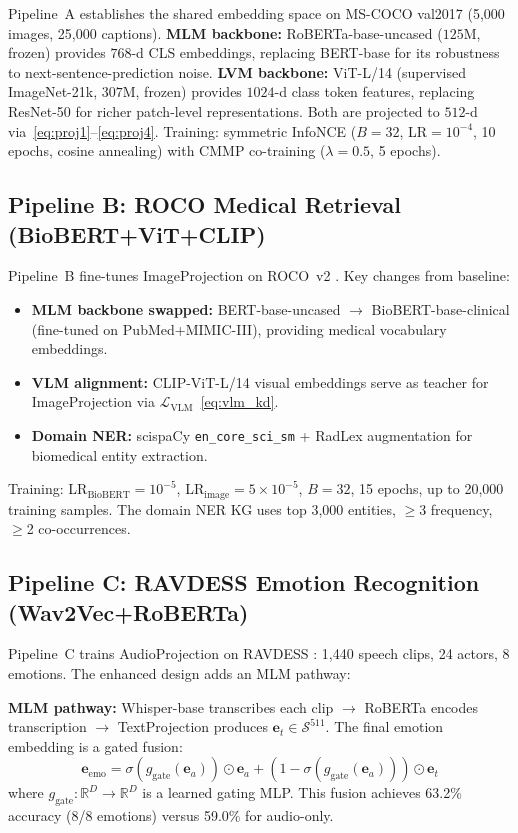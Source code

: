 \documentclass[10pt,conference]{IEEEtran}
\theoremstyle{ieeethm}
\theoremstyle{ieeedef}
\theoremstyle{ieeeremark}
\begin{document}
Pipeline~A establishes the shared embedding space on MS-COCO val2017 (5,000 images, 25,000 captions). \textbf{MLM backbone:} RoBERTa-base-uncased ($125$M, frozen) provides $768$-d CLS embeddings, replacing BERT-base for its robustness to next-sentence-prediction noise. \textbf{LVM backbone:} ViT-L/14 (supervised ImageNet-21k, $307$M, frozen) provides $1024$-d class token features, replacing ResNet-50 for richer patch-level representations. Both are projected to $512$-d via~\eqref{eq:proj1}--\eqref{eq:proj4}. Training: symmetric InfoNCE ($B{=}32$, LR$=10^{-4}$, 10 epochs, cosine annealing) with CMMP co-training ($\lambda{=}0.5$, 5 epochs).

\subsection{Pipeline B: ROCO Medical Retrieval (BioBERT+ViT+CLIP)}

Pipeline~B fine-tunes ImageProjection on ROCO~v2 \cite{pelka2018radiology}. Key changes from baseline:
\begin{itemize}
  \item \textbf{MLM backbone swapped:} BERT-base-uncased $\to$ BioBERT-base-clinical (fine-tuned on PubMed+MIMIC-III), providing medical vocabulary embeddings.
  \item \textbf{VLM alignment:} CLIP-ViT-L/14 visual embeddings serve as teacher for ImageProjection via $\mathcal{L}_\text{VLM}$~\eqref{eq:vlm_kd}.
  \item \textbf{Domain NER:} scispaCy \texttt{en\_core\_sci\_sm} + RadLex augmentation for biomedical entity extraction.
\end{itemize}

Training: LR$_\text{BioBERT}{=}10^{-5}$, LR$_\text{image}{=}5{\times}10^{-5}$, $B{=}32$, 15 epochs, up to 20,000 training samples. The domain NER KG uses top 3,000 entities, $\geq$3 frequency, $\geq$2 co-occurrences.

\subsection{Pipeline C: RAVDESS Emotion Recognition (Wav2Vec+RoBERTa)}

Pipeline~C trains AudioProjection on RAVDESS \cite{livingstone2018ryerson}: 1,440 speech clips, 24 actors, 8 emotions. The enhanced design adds an MLM pathway:

\textbf{MLM pathway:} Whisper-base transcribes each clip $\to$ RoBERTa encodes transcription $\to$ TextProjection produces $\mathbf{e}_t \in \mathcal{S}^{511}$. The final emotion embedding is a gated fusion:
\begin{equation}
\mathbf{e}_\text{emo} = \sigma(g_\text{gate}(\mathbf{e}_a)) \odot \mathbf{e}_a + (1-\sigma(g_\text{gate}(\mathbf{e}_a))) \odot \mathbf{e}_t
\label{eq:gate_fusion}
\end{equation}
where $g_\text{gate} : \mathbb{R}^D \to \mathbb{R}^D$ is a learned gating MLP. This fusion achieves 63.2\% accuracy (8/8 emotions) versus 59.0\% for audio-only.
\end{document}
